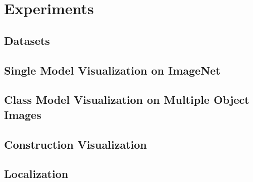 \section{Experiments}

\subsection{Datasets}

\subsection{Single Model Visualization on ImageNet}

\subsection{Class Model Visualization on Multiple Object Images}

\subsection{Construction Visualization}

\subsection{Localization}
